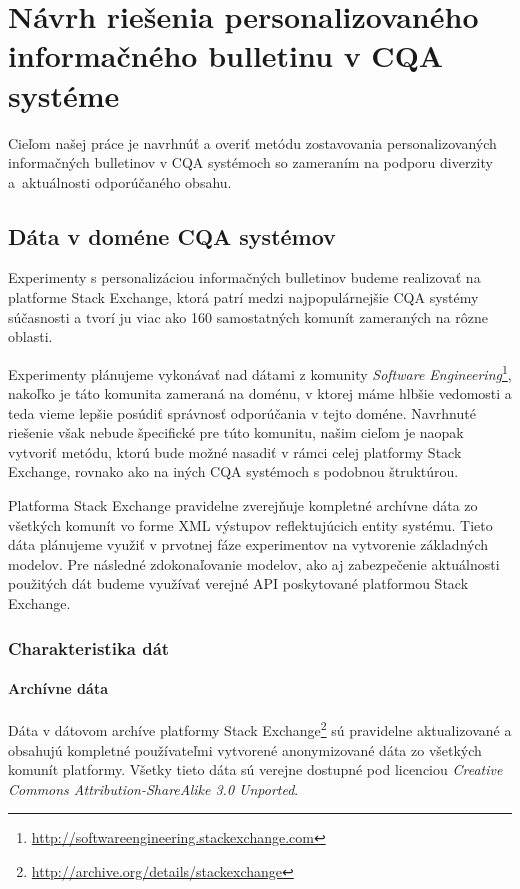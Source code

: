 \newpage
\chapter{Návrh riešenia personalizovaného informačného bulletinu v CQA systéme}

Cieľom našej práce je navrhnúť a overiť metódu zostavovania personalizovaných informačných bulletinov v CQA systémoch
so zameraním na podporu diverzity a~aktuálnosti odporúčaného obsahu.

\section{Dáta v doméne CQA systémov}

Experimenty s personalizáciou informačných bulletinov budeme realizovať na platforme Stack Exchange, ktorá patrí medzi
najpopulárnejšie CQA systémy súčasnosti a tvorí ju viac ako 160 samostatných komunít zameraných na rôzne oblasti.

Experimenty plánujeme vykonávať nad dátami z komunity \textit{Software Engineering}\footnote{\url{http://softwareengineering.stackexchange.com}},
nakoľko je táto komunita zameraná na doménu, v ktorej máme hlbšie vedomosti a teda vieme lepšie posúdiť správnosť
odporúčania v tejto doméne. Navrhnuté riešenie však nebude špecifické pre túto komunitu, našim cieľom je naopak vytvoriť
metódu, ktorú bude možné nasadiť v rámci celej platformy Stack Exchange, rovnako ako na iných CQA systémoch s podobnou
štruktúrou.

Platforma Stack Exchange pravidelne zverejňuje kompletné archívne dáta zo všetkých komunít vo forme XML výstupov reflektujúcich
entity systému. Tieto dáta plánujeme využiť v prvotnej fáze experimentov na vytvorenie základných modelov.
Pre následné zdokonaľovanie modelov, ako aj zabezpečenie aktuálnosti použitých dát budeme využívať verejné API poskytované
platformou Stack Exchange.

\subsection{Charakteristika dát}

\subsubsection{Archívne dáta}
Dáta v dátovom archíve platformy Stack Exchange\footnote{\url{http://archive.org/details/stackexchange}} sú pravidelne
aktualizované a obsahujú kompletné používateľmi vytvorené anonymizované dáta zo všetkých komunít platformy.
Všetky tieto dáta sú verejne dostupné pod licenciou \emph{Creative Commons Attribution-ShareAlike 3.0 Unported}.

